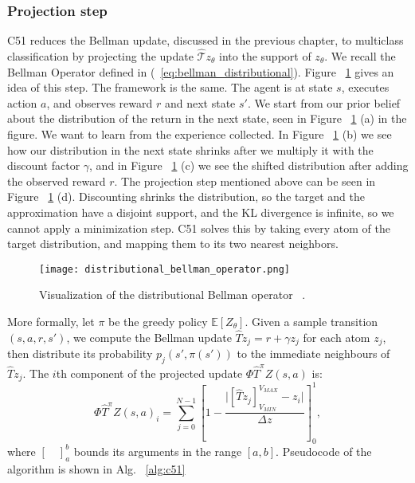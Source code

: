 \subsubsection{Projection step}
C51 reduces the Bellman update, discussed in the previous chapter, to multiclass classification by projecting the update $\hat{\mathcal{T}}z_\theta$ into the support of $z_{\theta}$. We recall the Bellman Operator defined in (~\ref{eq:bellman_distributional}). Figure ~\ref{fig:distributional_operator} gives an idea of this step. The framework is the same. The agent is at state $s$, executes action $a$, and observes reward $r$ and next state $s'$. We start from our prior belief about the distribution of the return in the next state, seen in Figure ~\ref{fig:distributional_operator} (a) in the figure. We want to learn from the experience collected. In Figure ~\ref{fig:distributional_operator} (b) we see how our distribution in the next state shrinks after we multiply it with the discount factor $\gamma$, and in Figure ~\ref{fig:distributional_operator} (c) we see the shifted distribution after adding the observed reward $r$. The projection step mentioned above can be seen in Figure ~\ref{fig:distributional_operator} (d). Discounting shrinks the distribution, so the target and the approximation have a disjoint support, and the KL divergence is infinite, so we cannot apply a minimization step. C51 solves this by taking every atom of the target distribution, and mapping them to its two nearest neighbors.\par
\begin{figure}
 \texttt{[image: distributional\_bellman\_operator.png]}
 \caption{Visualization of the distributional Bellman operator ~\cite{DBLP:journals/corr/BellemareDM17}.}
 \label{fig:distributional_operator}
\end{figure}
More formally, let $\pi$ be the greedy policy \wrt $\mathbb{E}[Z_\theta]$. Given a sample transition $(s,a,r,s′)$, we compute the Bellman update $\widehat{T}z_j=r+\gamma z_j$ for each atom $z_j$, then distribute its probability $p_j(s′,\pi(s′))$ to the immediate neighbours of $\widehat{T}z_j$. The $i$th component of the projected update $\Phi \widehat{T}^\pi Z(s,a)$ is:
\begin{equation}
	\Phi \widehat{T}^\pi Z(s,a)_i=\sum_{j=0}^{N-1} \left[1- \frac{\vert [\widehat{T}z_j]_{V_{MIN}}^{V_{MAX}} -z_i  \vert}{\Delta z} \right]_{0}^{1},
\end{equation}
where $[\quad]_{a}^{b}$ bounds its arguments in the range $[a,b]$. Pseudocode of the algorithm is shown in Alg. ~\ref{alg:c51}
